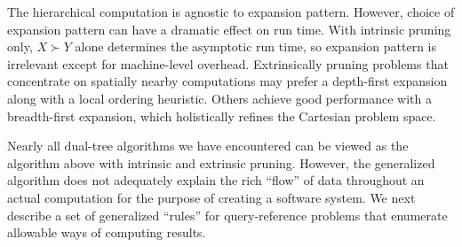 \documentclass[twoside,leqno,twocolumn]{article}
\newcommand{\prefsplit}[2]{#1 \succ #2}
\begin{document}
The hierarchical computation is agnostic to expansion pattern.
However, choice of expansion pattern can have a dramatic effect on run time.
With intrinsic pruning only, $\prefsplit{X}{Y}$ alone determines the asymptotic run time, so expansion pattern is irrelevant except for machine-level overhead.
Extrinsically pruning problems that concentrate on spatially nearby computations may prefer a depth-first expansion along with a local ordering heuristic.
Others achieve good performance with a breadth-first expansion, which holistically refines the Cartesian problem space.

Nearly all dual-tree algorithms we have encountered can be viewed as the algorithm above with intrinsic and extrinsic pruning.
However, the generalized algorithm does not adequately explain the rich ``flow'' of data throughout an actual computation for the purpose of creating a software system.
We next describe a set of generalized ``rules'' for query-reference problems that enumerate allowable ways of computing results.




\end{document}
